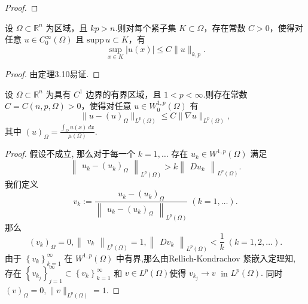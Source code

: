 \documentclass[lang=cn,newtx,10pt,scheme=chinese,thmcnt=chapter]{elegantbook}
\begin{document}
\begin{problemset}
\begin{proof}
\end{proof}
\item 设 \(\Omega \subset {\mathbb{R}}^{n}\) 为区域，且 \({kp} > n\).则对每个紧子集 \(K \subset \Omega\)，存在常数 \(C > 0\)，使得对任意 \(u \in {C}_{0}^{\infty}(\Omega)\) 且 \(\mathrm{supp}\,u \subset K\)，有
\[
\sup_{x \in K} |u(x)| \leqslant C\|u\|_{k,p}.
\]
\begin{proof}
    由定理3.10易证.
\end{proof}
\item 设 \(\Omega \subset {\mathbb{R}}^{n}\) 为具有 \({C}^{1}\) 边界的有界区域，且 \(1 < p < \infty\).则存在常数 \(C = C(n,p,\Omega) > 0\)，使得对任意 \(u \in {W}_{0}^{1,p}(\Omega)\) 有
\[
\|u - (u)_{\Omega}\|_{L^{p}(\Omega)} \leqslant C\|\nabla u\|_{L^{p}(\Omega)},
\]
其中 \((u)_{\Omega} = \frac{\int_{\Omega} u(x)\,dx}{\mu(\Omega)}\).
\begin{proof}
假设不成立, 那么对于每一个 \( k = 1,\ldots \) 存在 \( {u}_{k} \in  {W}^{1,p}\left( \Omega\right) \) 满足 \[ {\begin{Vmatrix}{u}_{k} - {\left( {u}_{k}\right) }_{\Omega}\end{Vmatrix}}_{{L}^{p}\left( \Omega\right) } > k{\begin{Vmatrix}D{u}_{k}\end{Vmatrix}}_{{L}^{p}\left( \Omega\right) }. \]
我们定义
\[ {v}_{k} \mathrel{\text{:=}} \frac{{u}_{k} - {\left( {u}_{k}\right) }_{\Omega}}{{\begin{Vmatrix}{u}_{k} - {\left( {u}_{k}\right) }_{\Omega}\end{Vmatrix}}_{{L}^{p}\left( \Omega\right) }}\;\left( {k = 1,\ldots }\right) . \]
那么
\[ {\left( {v}_{k}\right) }_{\Omega} = 0,{\begin{Vmatrix}{v}_{k}\end{Vmatrix}}_{{L}^{p}\left( \Omega\right) } = 1,{\begin{Vmatrix}D{v}_{k}\end{Vmatrix}}_{{L}^{p}\left( \Omega\right) } < \frac{1}{k}\;\left( {k = 1,2,\ldots }\right) . \]
由于 \( {\left\{  {v}_{k}\right\}  }_{k = 1}^{\infty } \) 在 \( {W}^{1,p}\left( \Omega\right) \) 中有界,那么由Rellich-Kondrachov 紧嵌入定理知,
存在 \( {\left\{  {v}_{{k}_{j}}\right\}  }_{j = 1}^{\infty } \subset  {\left\{  {v}_{k}\right\}  }_{k = 1}^{\infty } \) 和 \( v \in  {L}^{p}\left( \Omega\right) \)使得 \( {v}_{{k}_{j}} \rightarrow  v\; \) in \( {L}^{p}\left( \Omega\right) . \)
同时\( {\left( v\right) }_{\Omega} = 0,\parallel v{\parallel }_{{L}^{p}\left( \Omega\right) } = 1. \)


\end{proof}
\end{problemset}
\end{document}
